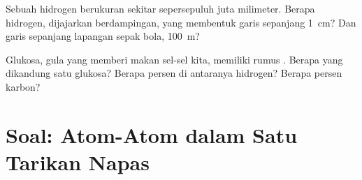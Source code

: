 \begin{exercise}[$\star\star\star$]\label{exo:g7:atoms-and-molecules:11}
Sebuah  hidrogen berukuran sekitar sepersepuluh juta milimeter.
Berapa  hidrogen, dijajarkan berdampingan, yang membentuk garis
sepanjang \qty{1}{cm}? Dan garis sepanjang lapangan sepak bola,
\qty{100}{m}?
\end{exercise}

\begin{exercise}[$\star\star\star$]\label{exo:g7:atoms-and-molecules:12}
Glukosa, gula yang memberi makan sel-sel kita, memiliki rumus
. Berapa  yang dikandung satu  glukosa? Berapa
persen di antaranya  hidrogen? Berapa persen  karbon?
\end{exercise}

\section{Soal: Atom-Atom dalam Satu Tarikan Napas}

